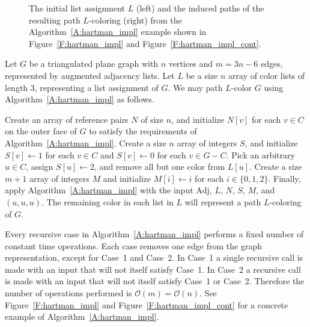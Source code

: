 \documentclass[12pt,letterpaper]{article}
\theoremstyle{plain}
\theoremstyle{definition}
\theoremstyle{break}
\begin{document}
\begin{figure}
\begin{center}
\caption{The initial list assignment $L$ (left) and the induced paths of the
resulting path
$L$-coloring (right)
from the Algorithm~\ref{A:hartman_impl} example shown in
Figure~\ref{F:hartman_impl} and Figure~\ref{F:hartman_impl_cont}.}
\label{F:hartman_impl_comp}
\end{center}
\end{figure}

Let $G$ be a triangulated plane graph with $n$ vertices and $m=3n-6$ edges,
represented by augmented adjacency
lists. Let $L$ be a size $n$ array of color lists of length $3$,
representing a list assignment of $G$. We may path $L$-color $G$ using
Algorithm~\ref{A:hartman_impl} as follows.

Create an array of reference pairs $N$ of size $n$, and initialize $N[v]$
for each $v\in C$ on the outer face of $G$ to satisfy
the requirements of Algorithm~\ref{A:hartman_impl}. Create a size $n$ array of
integers $S$, and initialize $S[v]\leftarrow 1$ for each $v\in C$ and
$S[v]\leftarrow 0$ for each $v\in G-C$. Pick an arbitrary $u\in C$,
assign $S[u]\leftarrow 2$, and remove all but one color from $L[u]$.
Create a size $m+1$ array of integers $M$ and initialize
$M[i]\leftarrow i$ for each $i\in\{0,1,2\}$.
Finally, apply
Algorithm~\ref{A:hartman_impl} with the input $\text{Adj}$, $L$,
$N$, $S$, $M$, and $(u, u, u)$. The remaining color in each
list in $L$ will represent a path $L$-coloring of $G$.

Every recursive case in Algorithm~\ref{A:hartman_impl} performs a fixed number
of constant time operations. Each case removes one edge from the graph
representation,
except for Case~1 and Case~2. In Case~1 a single recursive call is made
with an input that will not itself satisfy Case~1. In Case~2 a recursive
call is made with an input that will not itself satisfy Case~1 or Case~2.
Therefore the number of operations performed
is $\mathcal{O}(m)=\mathcal{O}(n)$. See Figure~\ref{F:hartman_impl} and
Figure~\ref{F:hartman_impl_cont} for a concrete example of
Algorithm~\ref{A:hartman_impl}.
\end{document}
